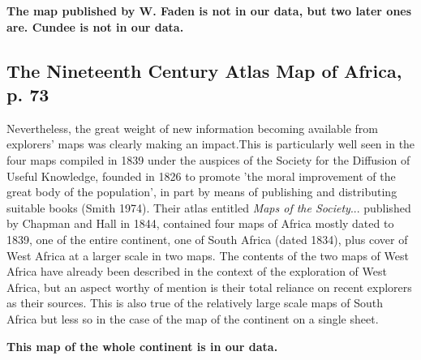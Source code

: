 \documentclass[12pt]{article}
\begin{document}
\textbf{The map published by W. Faden is not in our data, but two later ones
are. Cundee is not in our data.}
\subsection{The Nineteenth Century Atlas Map of Africa, p. 73}

Nevertheless, the great weight of new information becoming available from
explorers' maps was clearly making an impact.This is particularly well seen in
the four maps compiled in 1839 under the auspices of the Society for the
Diffusion of Useful Knowledge, founded in 1826 to promote 'the moral improvement
of the great body of the population', in part by means of publishing and
distributing suitable books (Smith 1974). Their atlas entitled \textit{Maps of
the Society}... published by Chapman and Hall in 1844, contained four maps of
Africa mostly dated to 1839, one of the entire continent, one of South Africa
(dated 1834), plus cover of West Africa at a larger scale in two maps. The
contents of the two maps of West Africa have already been described in the
context of the exploration of West Africa, but an aspect worthy of mention is
their total reliance on recent explorers as their sources. This is also true of
the relatively large scale maps of South Africa but less so in the case of the
map of the continent on a single sheet.

\textbf{This map of the whole continent is in our data.}

\pagebreak



\end{document}
